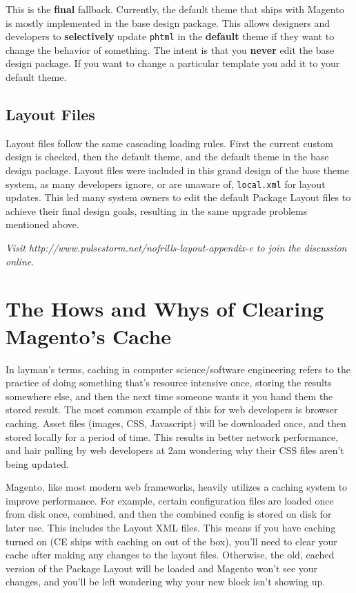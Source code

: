 \documentclass[oneside]{book}
\begin{document}
This is the \textbf{final} fallback.  Currently, the default theme that ships with Magento is mostly implemented in the base design package. This allows designers and developers to \textbf{selectively} update \footnotesize\texttt{phtml} \normalsize  in the \textbf{default} theme if they want to change the behavior of something.  The intent is that you \textbf{never} edit the base design package.  If you want to change a particular template you add it to your default theme.

\section{Layout Files}

Layout files follow the same cascading loading rules.  First the current custom design is checked, then the default theme, and the default theme in the base design package.  Layout files were included in this grand design of the base theme system, as many developers ignore, or are unaware of,  \footnotesize\texttt{local.xml} \normalsize  for layout updates. This led many system owners to edit the default Package Layout files to achieve their final design goals, resulting in the same upgrade problems mentioned above.

\emph{Visit http://www.pulsestorm.net/nofrills-layout-appendix-e to join the discussion online.}
\chapter{The Hows and Whys of Clearing Magento's Cache}
In layman's terms, caching in computer science/software engineering refers to the practice of doing something that's resource intensive once, storing the results somewhere else, and then the next time someone wants it you hand them the stored result.  The most common example of this for web developers is browser caching.  Asset files (images, CSS, Javascript) will be downloaded once, and then stored locally for a period of time.  This results in better network performance, and hair pulling by web developers at 2am wondering why their CSS files aren't being updated.

Magento, like most modern web frameworks, heavily utilizes a caching system to improve performance.  For example, certain configuration files are loaded once from disk once, combined, and then the combined config is stored on disk for later use.  This includes the Layout XML files.  This means if you have caching turned on (CE ships with caching on out of the box), you'll need to clear your cache after making any changes to the layout files.  Otherwise, the old, cached version of the Package Layout will be loaded and Magento won't see your changes, and you'll be left wondering why your new block isn't showing up.
\end{document}
